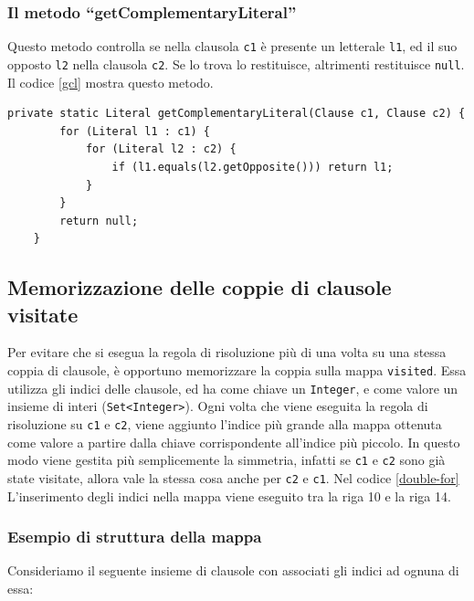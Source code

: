 \documentclass[a4paper,12pt]{report}
\begin{document}
\subsubsection{Il metodo ``getComplementaryLiteral''}
Questo metodo controlla se nella clausola \texttt{c1} è presente un letterale \texttt{l1}, ed il suo opposto \texttt{l2} nella clausola \texttt{c2}. Se lo trova lo restituisce, altrimenti restituisce \texttt{null}. Il codice \ref*{gcl} mostra questo metodo. 

\begin{lstlisting}[caption={Metodo ``getComplementaryLiteral'' della classe Resolution}, label={gcl}]
    private static Literal getComplementaryLiteral(Clause c1, Clause c2) { 
        for (Literal l1 : c1) {
            for (Literal l2 : c2) { 
                if (l1.equals(l2.getOpposite())) return l1;
            }
        }
        return null;
    }
\end{lstlisting}

\subsection{Memorizzazione delle coppie di clausole visitate}
\label{visited}
Per evitare che si esegua la regola di risoluzione più di una volta su una stessa coppia di clausole, è opportuno memorizzare la coppia sulla mappa \texttt{visited}. Essa utilizza gli indici delle clausole, ed ha come chiave un \texttt{Integer}, e come valore un insieme di interi (\texttt{Set<Integer>}). Ogni volta che viene eseguita la regola di risoluzione su \texttt{c1} e \texttt{c2}, viene aggiunto l'indice più grande alla mappa ottenuta come valore a partire dalla chiave corrispondente all'indice più piccolo. In questo modo viene gestita più semplicemente la simmetria, infatti se \texttt{c1} e \texttt{c2} sono già state visitate, allora vale la stessa cosa anche per \texttt{c2} e \texttt{c1}. Nel codice \ref{double-for} L'inserimento degli indici nella mappa viene eseguito tra la riga 10 e la riga 14.

\subsubsection{Esempio di struttura della mappa}
Consideriamo il seguente insieme di clausole con associati gli indici ad ognuna di essa:

\vspace{10pt}
\end{document}
